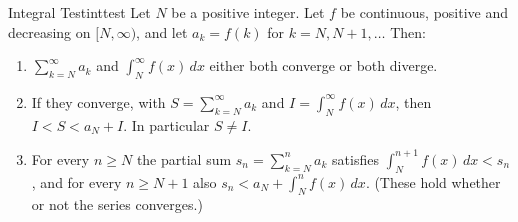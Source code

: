 \documentclass[11pt]{article}
\begin{document}
\begin{thm}{Integral Test}{inttest}
Let $N$ be a positive integer. Let $f$ be continuous, positive and decreasing on $[N,\infty)$, and let $a_k=f(k)$ for $k=N,N+1,\dots$ Then:
\begin{enumerate}[label=(\alph*)]
  \item $\displaystyle\sum_{k=N}^\infty a_k$ and $\displaystyle\int_N^\infty f(x)\,dx$ either both converge or both diverge.
  \item If they converge, with $S=\sum_{k=N}^\infty a_k$ and $I=\int_N^\infty f(x)\,dx$, then $I<S<a_N+I$. In particular $S\ne I$.
  \item For every $n\ge N$ the partial sum $s_n=\sum_{k=N}^na_k$ satisfies $\displaystyle\int_N^{n+1}f(x)\,dx<s_n$, and for every $n\ge N+1$ also $s_n<a_N+\displaystyle\int_N^nf(x)\,dx$. (These hold whether or not the series converges.)
\end{enumerate}
\end{thm}
\end{document}
